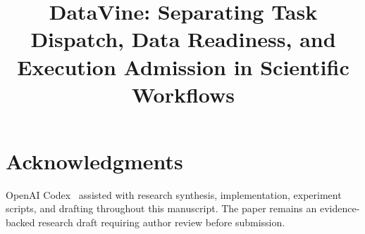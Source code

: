 \documentclass[conference,10pt,letterpaper]{IEEEtran}
\title{DataVine: Separating Task Dispatch, Data Readiness, and Execution Admission in Scientific Workflows}
\author{\IEEEauthorblockN{Anonymous submission draft}}
\begin{document}
\maketitle










\section*{Acknowledgments}
OpenAI Codex~\cite{codex} assisted with research synthesis, implementation,
experiment scripts, and drafting throughout this manuscript. The paper remains
an evidence-backed research draft requiring author review before submission.
\end{document}
